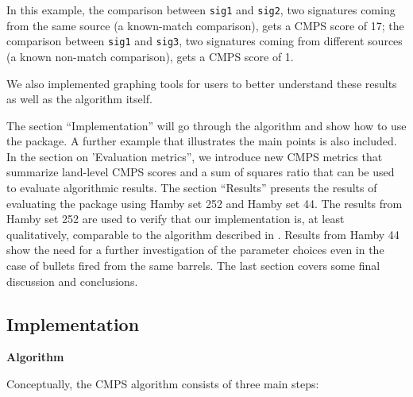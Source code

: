 In this example, the comparison between \texttt{sig1} and \texttt{sig2},
two signatures coming from the same source (a known-match comparison),
gets a CMPS score of 17; the comparison between \texttt{sig1} and
\texttt{sig3}, two signatures coming from different sources (a known
non-match comparison), gets a CMPS score of 1.

We also implemented graphing tools for users to better understand these
results as well as the algorithm itself.

The section ``Implementation'' will go through the algorithm and show
how to use the  package. A further example that illustrates
the main points is also included. In the section on 'Evaluation
metrics'', we introduce new CMPS metrics that summarize land-level CMPS
scores and a sum of squares ratio that can be used to evaluate
algorithmic results. The section ``Results'' presents the results of
evaluating the  package using Hamby set 252 and Hamby set 44.
The results from Hamby set 252 are used to verify that our
implementation is, at least qualitatively, comparable to the algorithm
described in \citet{cmps}. Results from Hamby 44 show the need for a
further investigation of the parameter choices even in the case of
bullets fired from the same barrels. The last section covers some final
discussion and conclusions.

\hypertarget{implementation}{%
\subsection{Implementation}\label{implementation}}

\textbf{Algorithm}

Conceptually, the CMPS algorithm consists of three main steps:

